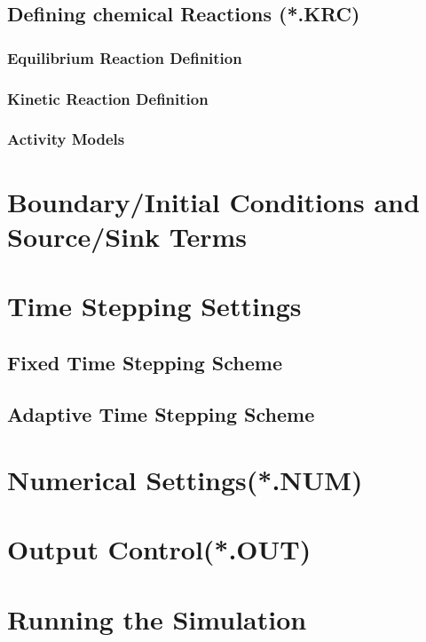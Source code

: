 \subsection{Defining chemical Reactions (*.KRC)}

\subsubsection{Equilibrium Reaction Definition}

\subsubsection{Kinetic Reaction Definition}

\subsubsection{Activity Models}

\section{Boundary/Initial Conditions and Source/Sink Terms}

\section{Time Stepping Settings}

\subsection{Fixed Time Stepping Scheme}

\subsection{Adaptive Time Stepping Scheme}

\section{Numerical Settings(*.NUM)}

\section{Output Control(*.OUT)}

\section{Running the Simulation}

